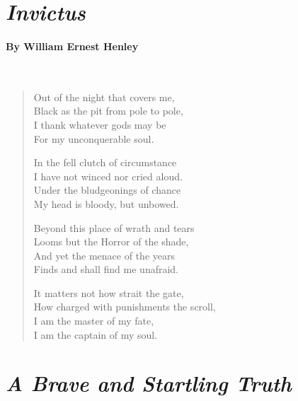 \newpage
\section*{\emph{Invictus}}
\paragraph{By William Ernest Henley}~
\begin{verse}
	Out of the night that covers me,\\
	\hspace{1em}Black as the pit from pole to pole,\\
	I thank whatever gods may be\\
	\hspace{1em}For my unconquerable soul.
	
	In the fell clutch of circumstance\\
	\hspace{1em}I have not winced nor cried aloud.\\
	Under the bludgeonings of chance\\
	\hspace{1em}My head is bloody, but unbowed.
	
	Beyond this place of wrath and tears\\
	\hspace{1em}Looms but the Horror of the shade,\\
	And yet the menace of the years\\
	\hspace{1em}Finds and shall find me unafraid.
	
	It matters not how strait the gate,\\
	\hspace{1em}How charged with punishments the scroll,\\
	I am the master of my fate,\\
	\hspace{1em}I am the captain of my soul.
\end{verse}

\newpage
{}
\section*{\emph{A Brave and Startling Truth}}
